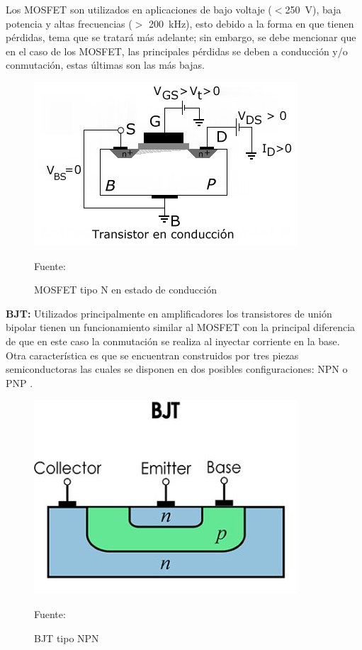 Los MOSFET son utilizados en aplicaciones de bajo voltaje ($<$\SI{250}{\volt}), baja potencia y altas frecuencias ($>$ \SI{200}{\kilo\hertz}), esto debido a la forma en que tienen pérdidas, tema que se tratará más adelante; sin embargo, se debe mencionar que en el caso de los MOSFET, las principales pérdidas  se deben a conducción y/o conmutación, estas últimas son las más bajas. \cite{beltran}

\begin{figure}[H]
\centering
\includegraphics[scale=1]{Figuras/mosfet.png}
\caption{MOSFET tipo N en estado de conducción}
Fuente: \cite{Imagen_mosfet}
\label{tipo n}
\end{figure}

\textbf{BJT:} Utilizados principalmente en amplificadores los transistores de unión bipolar tienen un funcionamiento similar al MOSFET con la principal diferencia de que en este caso la conmutación se realiza al inyectar corriente en la base. Otra característica es que se encuentran construidos por tres piezas semiconductoras las cuales se disponen en dos posibles configuraciones: NPN o PNP . 

\begin{figure}[h]
\centering
\includegraphics[scale=0.7]{Figuras/bjt.png}
\caption{BJT tipo NPN}
Fuente: \cite{bjt}
\label{bjt}
\end{figure}

